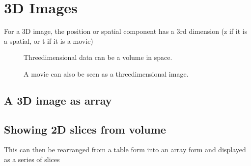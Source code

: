 \documentclass[letterpaper,10pt,english]{sphinxmanual}
\begin{document}
\section{3D Images}
\label{\detokenize{01-Introduction:d-images}}
\sphinxAtStartPar
For a 3D image, the position or spatial component has a 3rd dimension (z if it is a spatial, or t if it is a movie)



\begin{figure}[htbp]
\centering
\capstart

\noindent{}
\caption{Three\sphinxhyphen{}dimensional data can be a volume in space.}\label{\detokenize{01-Introduction:id15}}\end{figure}

\begin{figure}[htbp]
\centering
\capstart

\noindent{}
\caption{A movie can also be seen as a three\sphinxhyphen{}dimensional image.}\label{\detokenize{01-Introduction:id16}}\end{figure}


\subsection{A 3D image as array}
\label{\detokenize{01-Introduction:a-3d-image-as-array}}
\begin{sphinxVerbatim}[commandchars=\\\{\}]
   
  
\end{sphinxVerbatim}


\subsection{Showing 2D slices from volume}
\label{\detokenize{01-Introduction:showing-2d-slices-from-volume}}
\sphinxAtStartPar
This can then be rearranged from a table form into an array form and displayed as a series of slices
\end{document}
